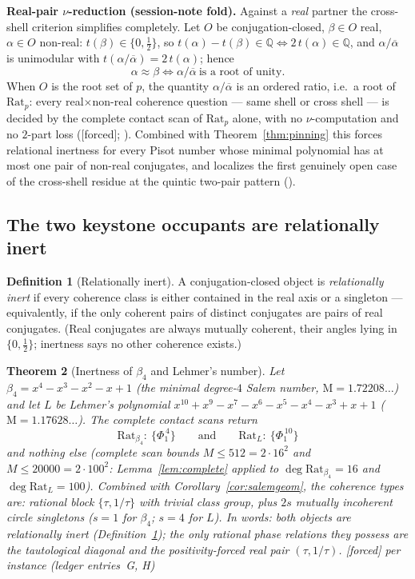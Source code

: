 \documentclass[11pt]{article}
\theoremstyle{plain}
\newtheorem{theorem}{Theorem}[section]
\theoremstyle{definition}
\newtheorem{definition}[theorem]{Definition}
\theoremstyle{remark}
\newcommand{\Q}{\mathbb{Q}}
\newcommand{\Mah}{\mathrm{M}}
\newcommand{\Rat}{\mathrm{Rat}}
\newcommand{\F}{\textnormal{[forced]}}
\begin{document}
\medskip
\noindent\textbf{Real-pair $\nu$-reduction (session-note fold).}
Against a \emph{real} partner the cross-shell criterion simplifies
completely. Let $O$ be conjugation-closed, $\beta\in O$ real, $\alpha\in O$
non-real: $t(\beta)\in\{0,\tfrac12\}$, so
$t(\alpha)-t(\beta)\in\Q\iff2\,t(\alpha)\in\Q$, and
$\alpha/\overline{\alpha}$ is unimodular with
$t(\alpha/\overline{\alpha})=2\,t(\alpha)$; hence
\[
\alpha\approx\beta\iff\alpha/\overline{\alpha}\ \text{is a root of unity}.
\]
When $O$ is the root set of $p$, the quantity $\alpha/\overline{\alpha}$ is
an ordered ratio, i.e.\ a root of $\Rat_p$: every real$\times$non-real
coherence question --- same shell or cross shell --- is decided by the
complete contact scan of $\Rat_p$ alone, with no $\nu$-computation and no
$2$-part loss (\F; \cite[Lem.~4.1]{pisotnote}). Combined with
Theorem~\ref{thm:pinning} this forces relational inertness for every Pisot
number whose minimal polynomial has at most one pair of non-real
conjugates, and localizes the first genuinely open case of the cross-shell
residue at the quintic two-pair pattern
(\cite[Thm.~4.2, Cor.~4.3]{pisotnote}).

\subsection{The two keystone occupants are relationally inert}

\begin{definition}[Relationally inert]\label{def:inert}
A conjugation-closed object is \emph{relationally inert} if every coherence
class is either contained in the real axis or a singleton --- equivalently,
if the only coherent pairs of distinct conjugates are pairs of real
conjugates. (Real conjugates are always mutually coherent, their angles
lying in $\{0,\tfrac12\}$; inertness says no other coherence exists.)
\end{definition}

\begin{theorem}[Inertness of $\beta_4$ and Lehmer's number]\label{thm:inert}
Let $\beta_4=x^4-x^3-x^2-x+1$ (the minimal degree-$4$ Salem number,
$\Mah=1.72208\ldots$) and let $L$ be Lehmer's polynomial
$x^{10}+x^9-x^7-x^6-x^5-x^4-x^3+x+1$ ($\Mah=1.17628\ldots$). The complete
contact scans return
\[
\Rat_{\beta_4}:\ \{\Phi_1^{\,4}\}\qquad\text{and}\qquad
\Rat_{L}:\ \{\Phi_1^{\,10}\}
\]
and nothing else (complete scan bounds $M\le512=2\cdot16^2$ and
$M\le20000=2\cdot100^2$: Lemma~\ref{lem:complete} applied to
$\deg\Rat_{\beta_4}=16$ and $\deg\Rat_L=100$). Combined
with Corollary~\ref{cor:salemgeom}, the coherence types are: rational block
$\{\tau,1/\tau\}$ with trivial class group, plus $2s$ mutually incoherent
circle singletons ($s=1$ for $\beta_4$; $s=4$ for $L$). In words: \emph{both
objects are relationally inert (Definition~\ref{def:inert}); the only rational
phase relations they possess are the tautological diagonal and the
positivity-forced real pair $(\tau,1/\tau)$.}
\F{} per instance (ledger entries~G, H)
\end{theorem}
\end{document}

